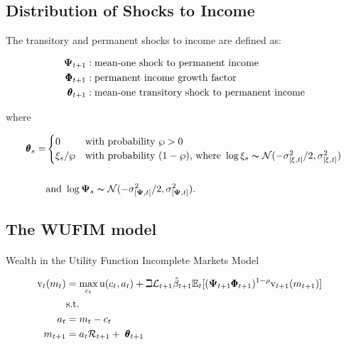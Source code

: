 \documentclass[
  letterpaper,
  DIV=11,
  numbers=noendperiod]{scrartcl}
\makeatletter
\let\oldparagraph\paragraph
\renewcommand{\paragraph}{
    \@ifstar
      \xxxParagraphStar
      \xxxParagraphNoStar
  }
\newcommand{\xxxParagraphStar}[1]{\oldparagraph*{#1}\mbox{}}
\newcommand{\xxxParagraphNoStar}[1]{\oldparagraph{#1}\mbox{}}
\makeatother
\begin{document}
\subsection{Distribution of Shocks to
Income}\label{distribution-of-shocks-to-income}

The transitory and permanent shocks to income are defined as:

\[\begin{aligned}
  \mathbf{\Psi}_{t+1} & :  \text{mean-one shock to permanent income}
    \\ \pmb{\Phi}_{t+1} & :  \text{permanent income growth factor}
    \\ \pmb{\theta}_{t+1} & :  \text{mean-one transitory shock to permanent income}
\end{aligned}\]

where

\[\begin{aligned}
\TranShkEmp_{s}  = & \begin{cases} 0  & \text{with probability } \pZero>0  \\
\xi_{s}/\pZero & \text{with probability } (1-\pZero) \text{, where } \log \xi_{s}\thicksim \mathcal{N}(-\sigma_{[\xi, t]}^{2}/2,\sigma_{[\xi, t]}^{2}) \end{cases} \\
\phantom{/\pZero} \\ & \text{and }  \log \PermShk_{s}   \thicksim \mathcal{N}(-\sigma_{[\PermShk, t]}^{2}/2,\sigma_{[\PermShk, t]}^{2}).
\end{aligned}\]

\subsection{The WUFIM model}\label{the-wufim-model}

\paragraph{Wealth in the Utility Function Incomplete Markets
Model}\label{wealth-in-the-utility-function-incomplete-markets-model}

\[\begin{aligned}
    {\mathrm{v}}_{t}({m}_{t}) & = \max_{c_{t}}  \mathrm{u}(c_{t}, a_{t})+\beth\mathcal{L}_{t+1}\hat{\beta}_{t+1}
    \mathbb{E}_{t}[(\mathbf{\Psi}_{t+1}\pmb{\Phi}_{t+1})^{1-\rho}{\mathrm{v}}_{t+1}({m}_{t+1})]
    \\ & \text{s.t.} &
    \\ a_{t} & = {m}_{t}-c_{t}
    \\ {m}_{t+1} & = a_{t}\mathcal{R}_{t+1}+ ~\pmb{\theta}_{t+1}
\end{aligned}\]
\end{document}
